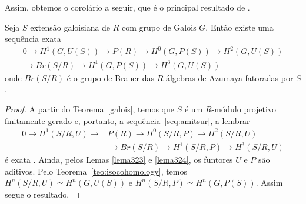 Assim, obtemos o corolário a seguir, que é o principal resultado de \cite{chr}.
\begin{corol} \label{corol:seqexata}
Seja $S$ extensão galoisiana de $R$ com grupo de Galois $G$. Então existe uma sequência exata
\begin{equation*} \begin{split}
0 \rightarrow H^1(G,U(S)) \rightarrow P(R) \rightarrow H^0(G,P(S)) \rightarrow H^2(G,U(S)) \\
\rightarrow Br(S/R) \rightarrow H^1(G,P(S)) \rightarrow H^3(G,U(S))
\end{split}\end{equation*}
onde $Br(S/R)$ é o grupo de Brauer das $R$-álgebras de Azumaya fatoradas por $S$.
\begin{proof}
A partir do Teorema~\ref{galois}, temos que $S$ é um $R$-módulo projetivo finitamente gerado e, portanto, a sequência~\eqref{seq:amitsur}, a lembrar
\begin{equation*} \begin{split}
    0 \rightarrow H^1(S/R,U) \rightarrow &P(R) \rightarrow H^0(S/R,P) \rightarrow H^2(S/R,U) \\
    &\rightarrow Br(S/R) \rightarrow H^1(S/R, P)\rightarrow H^3(S/R, U)
\end{split} \end{equation*}
é exata \cite[Theorem~7.6.]{amitsur}. Ainda, pelos Lemas \ref{lema323} e \ref{lema324}, os funtores $U$ e $P$ são aditivos. Pelo Teorema~\ref{teo:isocohomology}, temos $H^{n}(S/R, U) \simeq H^n(G,U(S))$ e $H^n(S/R, P) \simeq H^n(G,P(S))$. Assim segue o resultado.
\end{proof}
\end{corol}

